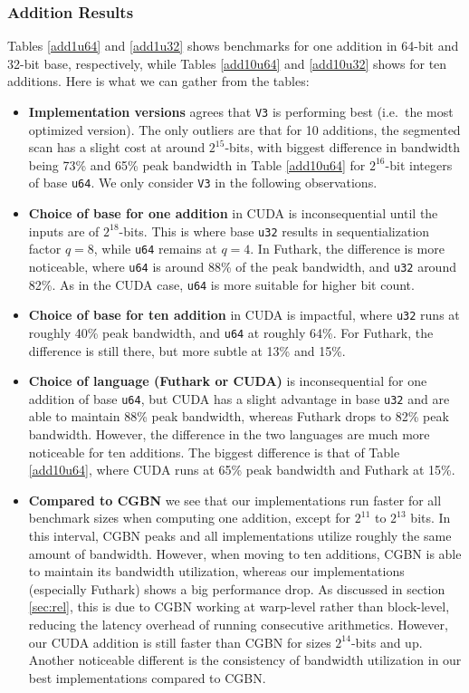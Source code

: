 \subsubsection{Addition Results}
\label{subsubsec:addres}

Tables \ref{add1u64} and \ref{add1u32} shows benchmarks for one addition in
64-bit and 32-bit base, respectively, while Tables \ref{add10u64} and
\ref{add10u32} shows for ten additions. Here is what we can gather from the
tables:
\begin{itemize}
  \renewcommand\labelitemi{--}
\item \textbf{Implementation versions} agrees that \texttt{V3} is performing
  best (i.e.\ the most optimized version). The only outliers are that for 10
  additions, the segmented scan has a slight cost at around $2^{15}$-bits, with
  biggest difference in bandwidth being 73\% and 65\% peak bandwidth in Table
  \ref{add10u64} for $2^{16}$-bit integers of base \texttt{u64}. We only
  consider \texttt{V3} in the following observations.
\item \textbf{Choice of base for one addition} in CUDA is inconsequential until
  the inputs are of $2^{18}$-bits. This is where base \texttt{u32} results in
  sequentialization factor $q=8$, while \texttt{u64} remains at $q = 4$. In
  Futhark, the difference is more noticeable, where \texttt{u64} is around 88\%
  of the peak bandwidth, and \texttt{u32} around 82\%. As in the CUDA case,
  \texttt{u64} is more suitable for higher bit count.
\item \textbf{Choice of base for ten addition} in CUDA is impactful, where
  \texttt{u32} runs at roughly 40\% peak bandwidth, and \texttt{u64} at roughly
  64\%. For Futhark, the difference is still there, but more subtle at 13\% and
  15\%.
\item \textbf{Choice of language (Futhark or CUDA)} is inconsequential for one
  addition of base \texttt{u64}, but CUDA has a slight advantage in base
  \texttt{u32} and are able to maintain 88\% peak bandwidth, whereas Futhark
  drops to 82\% peak bandwidth. However, the difference in the two languages are
  much more noticeable for ten additions. The biggest difference is that of
  Table \ref{add10u64}, where CUDA runs at 65\% peak bandwidth and Futhark at
  15\%.
\item \textbf{Compared to CGBN} we see that our implementations run faster for
  all benchmark sizes when computing one addition, except for $2^{11}$ to
  $2^{13}$ bits. In this interval, CGBN peaks and all implementations utilize
  roughly the same amount of bandwidth. However, when moving to ten additions,
  CGBN is able to maintain its bandwidth utilization, whereas our
  implementations (especially Futhark) shows a big performance drop. As
  discussed in section \ref{sec:rel}, this is due to CGBN working at warp-level
  rather than block-level, reducing the latency overhead of running consecutive
  arithmetics. However, our CUDA addition is still faster than CGBN for sizes
  $2^{14}$-bits and up. Another noticeable different is the consistency of
  bandwidth utilization in our best implementations compared to CGBN.
\end{itemize}

